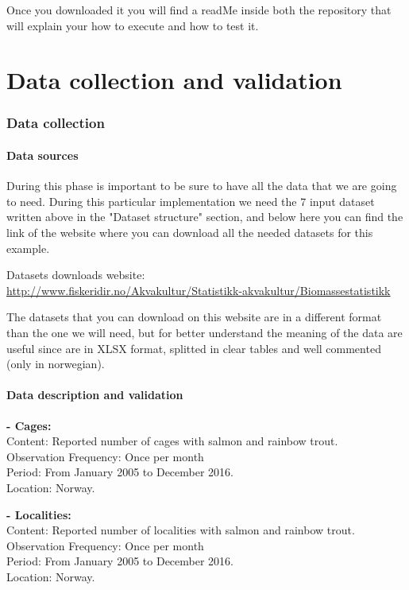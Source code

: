 Once you downloaded it you will find a readMe inside both the repository that will explain your how to execute and how to test it.

\part{Data collection and validation}
\newpage
\section{Data collection}
\subsection{Data sources}
During this phase is important to be sure to have all the data that we are going to need. During this particular implementation we need the 7 input dataset written above in the "Dataset structure" section, and below here you can find the link of the website where you can download all the needed datasets for this example.

Datasets downloads website:\\ 
\url{http://www.fiskeridir.no/Akvakultur/Statistikk-akvakultur/Biomassestatistikk}

The datasets that you can download on this website are in a different format than the one we will need, but for better understand the meaning of the data are useful since are in XLSX format, splitted in clear tables and well commented (only in norwegian).

\newpage
\subsection{Data description and validation}
\textbf{- Cages:}
	\\ Content: Reported number of cages with salmon and rainbow trout.
	\\ Observation Frequency: Once per month
	\\ Period:  From January 2005 to December 2016.
	\\ Location: Norway.

\textbf{- Localities:}
	\\ Content: Reported number of localities with salmon and rainbow trout. 
	\\ Observation Frequency: Once per month
	\\ Period:  From January 2005 to December 2016.
	\\ Location: Norway.


